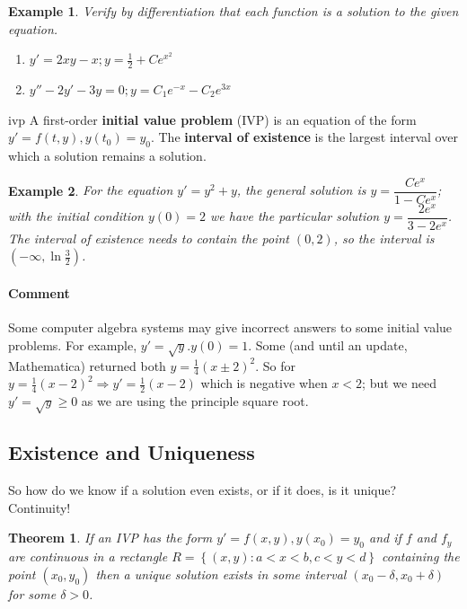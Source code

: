 \documentclass[letterpaper, 11pt, openany]{book}
\theoremstyle{mytheoremstyle}
\newtheorem{theorem}{Theorem}[section]
\theoremstyle{myexamplestyle}
\newtheorem{example}{Example}[section]
\newenvironment{commentary}{\paragraph{\sffamily \smaller \fontseries{b}\selectfont Comment}}{}
\begin{document}
\begin{example}\label{e:de-intro-check}
    Verify by differentiation that each function is a solution to the given equation.
    \begin{enumerate}
        \item \(y' = 2xy - x; y = \frac{1}{2} + Ce^{x^2}\)
        \item \(y'' - 2y' - 3y = 0; y = C_{1} e^{-x} - C_{2} e^{3x}\)
    \end{enumerate}
\end{example}

\begin{definition}{}{ivp}
    A first-order \textbf{initial value problem} (IVP) is an equation of the form \(y' = f(t,y), y(t_0) = y_0\). The \textbf{interval of existence} is the largest interval over which a solution remains a solution.
\end{definition}

\begin{example}\label{e:de-ioe}
    For the equation \(y' = y^{2} + y\), the general solution is \(y = \dfrac{Ce^{x}}{1 - Ce^{x}}\); with the initial condition \(y(0) = 2\) we have the particular solution \(y = \dfrac{2e^{x}}{3 - 2e^{x}}\). The interval of existence needs to contain the point \((0,2)\), so the interval is \(\left(-\infty, \ln \frac{3}{2}\right)\).
\end{example}

\begin{commentary}
    Some computer algebra systems may give incorrect answers to some initial value problems. For example, \(y' = \sqrt{y}. y(0) = 1\). Some (and until an update, Mathematica) returned both \(y = \frac{1}{4}(x\pm 2)^{2}\). So for \(y = \frac{1}{4}(x - 2)^{2} \Rightarrow y' = \frac{1}{2}(x-2)\) which is negative when \(x < 2\); but we need \(y' = \sqrt{y} \geq 0\) as we are using the principle square root.
 \end{commentary}

\subsection{Existence and Uniqueness}
So how do we know if a solution even exists, or if it does, is it unique? Continuity!
\begin{theorem}\label{t:de-exist-unique}
    If an IVP has the form \(y' = f(x,y), y(x_0) = y_0\) and if \(f\) and \(f_y\) are continuous in a rectangle \(R = \left\{(x,y) : a < x < b, c < y < d\right\}\) containing the point \((x_0, y_0)\) then a unique solution exists in some interval \((x_0 - \delta, x_0 + \delta)\) for some \(\delta > 0\).
\end{theorem}
\end{document}
